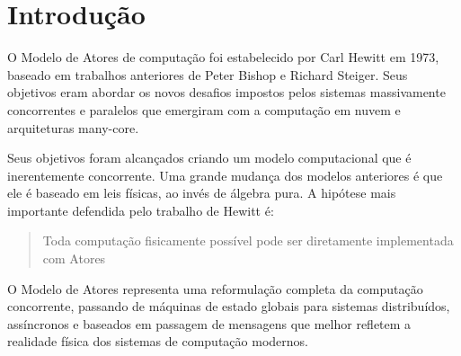 \section{Introdução}

O Modelo de Atores de computação foi estabelecido por Carl Hewitt em 1973, baseado em trabalhos anteriores de Peter Bishop e Richard Steiger. Seus objetivos eram abordar os novos desafios impostos pelos sistemas massivamente concorrentes e paralelos que emergiram com a computação em nuvem e arquiteturas many-core.

Seus objetivos foram alcançados criando um modelo computacional que é inerentemente concorrente. Uma grande mudança dos modelos anteriores é que ele é baseado em leis físicas, ao invés de álgebra pura. A hipótese mais importante defendida pelo trabalho de Hewitt é:

\begin{quote}
Toda computação fisicamente possível pode ser diretamente implementada com Atores
\end{quote}

O Modelo de Atores representa uma reformulação completa da computação concorrente, passando de máquinas de estado globais para sistemas distribuídos, assíncronos e baseados em passagem de mensagens que melhor refletem a realidade física dos sistemas de computação modernos.
